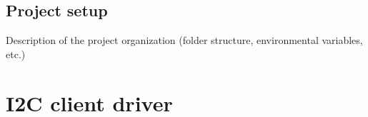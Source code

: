 \documentclass[a4paper,10pt]{article}
\newcommand{\icc}{I\textsuperscript{2}C }
\begin{document}
\begin{multicols}{2}





\subsection{Project setup}
\label{sec:project_setup}
Description of the project organization (folder structure, environmental variables, etc.)



\section{I2C client driver}
\label{sec:i2c_client_driver}


\end{multicols}
\end{document}
